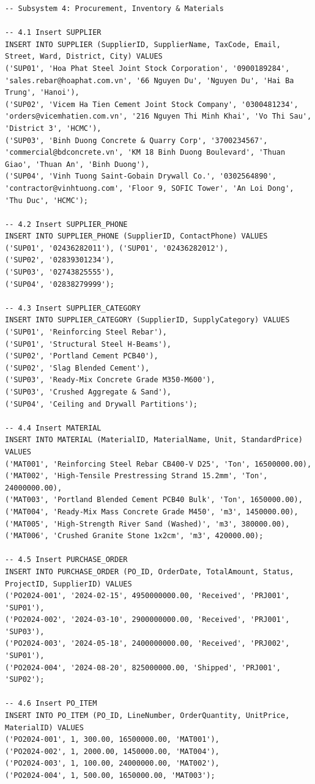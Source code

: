 \documentclass[a4paper,12pt]{report}
\begin{document}
\begin{lstlisting}
-- Subsystem 4: Procurement, Inventory & Materials

-- 4.1 Insert SUPPLIER
INSERT INTO SUPPLIER (SupplierID, SupplierName, TaxCode, Email, Street, Ward, District, City) VALUES
('SUP01', 'Hoa Phat Steel Joint Stock Corporation', '0900189284', 'sales.rebar@hoaphat.com.vn', '66 Nguyen Du', 'Nguyen Du', 'Hai Ba Trung', 'Hanoi'),
('SUP02', 'Vicem Ha Tien Cement Joint Stock Company', '0300481234', 'orders@vicemhatien.com.vn', '216 Nguyen Thi Minh Khai', 'Vo Thi Sau', 'District 3', 'HCMC'),
('SUP03', 'Binh Duong Concrete & Quarry Corp', '3700234567', 'commercial@bdconcrete.vn', 'KM 18 Binh Duong Boulevard', 'Thuan Giao', 'Thuan An', 'Binh Duong'),
('SUP04', 'Vinh Tuong Saint-Gobain Drywall Co.', '0302564890', 'contractor@vinhtuong.com', 'Floor 9, SOFIC Tower', 'An Loi Dong', 'Thu Duc', 'HCMC');

-- 4.2 Insert SUPPLIER_PHONE
INSERT INTO SUPPLIER_PHONE (SupplierID, ContactPhone) VALUES
('SUP01', '02436282011'), ('SUP01', '02436282012'),
('SUP02', '02839301234'),
('SUP03', '02743825555'),
('SUP04', '02838279999');

-- 4.3 Insert SUPPLIER_CATEGORY
INSERT INTO SUPPLIER_CATEGORY (SupplierID, SupplyCategory) VALUES
('SUP01', 'Reinforcing Steel Rebar'),
('SUP01', 'Structural Steel H-Beams'),
('SUP02', 'Portland Cement PCB40'),
('SUP02', 'Slag Blended Cement'),
('SUP03', 'Ready-Mix Concrete Grade M350-M600'),
('SUP03', 'Crushed Aggregate & Sand'),
('SUP04', 'Ceiling and Drywall Partitions');

-- 4.4 Insert MATERIAL
INSERT INTO MATERIAL (MaterialID, MaterialName, Unit, StandardPrice) VALUES
('MAT001', 'Reinforcing Steel Rebar CB400-V D25', 'Ton', 16500000.00),
('MAT002', 'High-Tensile Prestressing Strand 15.2mm', 'Ton', 24000000.00),
('MAT003', 'Portland Blended Cement PCB40 Bulk', 'Ton', 1650000.00),
('MAT004', 'Ready-Mix Mass Concrete Grade M450', 'm3', 1450000.00),
('MAT005', 'High-Strength River Sand (Washed)', 'm3', 380000.00),
('MAT006', 'Crushed Granite Stone 1x2cm', 'm3', 420000.00);

-- 4.5 Insert PURCHASE_ORDER
INSERT INTO PURCHASE_ORDER (PO_ID, OrderDate, TotalAmount, Status, ProjectID, SupplierID) VALUES
('PO2024-001', '2024-02-15', 4950000000.00, 'Received', 'PRJ001', 'SUP01'),
('PO2024-002', '2024-03-10', 2900000000.00, 'Received', 'PRJ001', 'SUP03'),
('PO2024-003', '2024-05-18', 2400000000.00, 'Received', 'PRJ002', 'SUP01'),
('PO2024-004', '2024-08-20', 825000000.00, 'Shipped', 'PRJ001', 'SUP02');

-- 4.6 Insert PO_ITEM
INSERT INTO PO_ITEM (PO_ID, LineNumber, OrderQuantity, UnitPrice, MaterialID) VALUES
('PO2024-001', 1, 300.00, 16500000.00, 'MAT001'),
('PO2024-002', 1, 2000.00, 1450000.00, 'MAT004'),
('PO2024-003', 1, 100.00, 24000000.00, 'MAT002'),
('PO2024-004', 1, 500.00, 1650000.00, 'MAT003');


\end{lstlisting}
\end{document}
